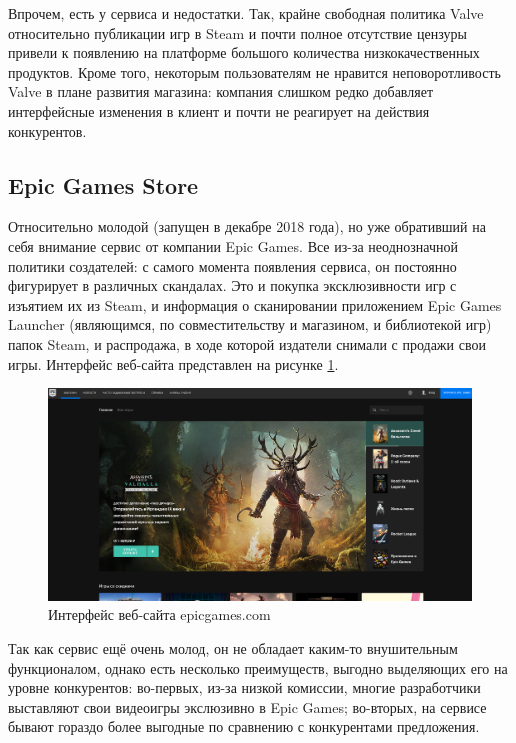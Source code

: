 Впрочем, есть у сервиса и недостатки. Так, крайне свободная политика Valve относительно публикации игр в Steam и почти полное отсутствие цензуры привели к появлению на платформе большого количества низкокачественных продуктов. Кроме того, некоторым пользователям не нравится неповоротливость Valve в плане развития магазина: компания слишком редко добавляет интерфейсные изменения в клиент и почти не реагирует на действия конкурентов.

\subsection{Epic Games Store}
\label{sec:analogues:egs}

Относительно молодой (запущен в декабре 2018 года), но уже обративший на себя внимание сервис от компании Epic Games. Все из-за неоднозначной политики создателей: с самого момента появления сервиса, он постоянно фигурирует в различных скандалах. Это и покупка эксклюзивности игр с изъятием их из Steam, и информация о сканировании приложением Epic Games Launcher (являющимся, по совместительству и магазином, и библиотекой игр) папок Steam, и распродажа, в ходе которой издатели снимали с продажи свои игры.
Интерфейс веб-сайта представлен на рисунке \ref*{sec:analogues:egs:layout}.

\begin{figure}[!htb]
	\centering
	  \includegraphics[scale=0.3]{attachments/egs.png}  
	  \caption{ Интерфейс веб-сайта epicgames.com }
	  \label{sec:analogues:egs:layout}
\end{figure}

Так как сервис ещё очень молод, он не обладает каким-то внушительным функционалом, однако есть несколько преимуществ, выгодно выделяющих его на уровне конкурентов: во-первых, из-за низкой комиссии, многие разработчики выставляют свои видеоигры экслюзивно в Epic Games; во-вторых, на сервисе бывают гораздо более выгодные по сравнению с конкурентами предложения.

